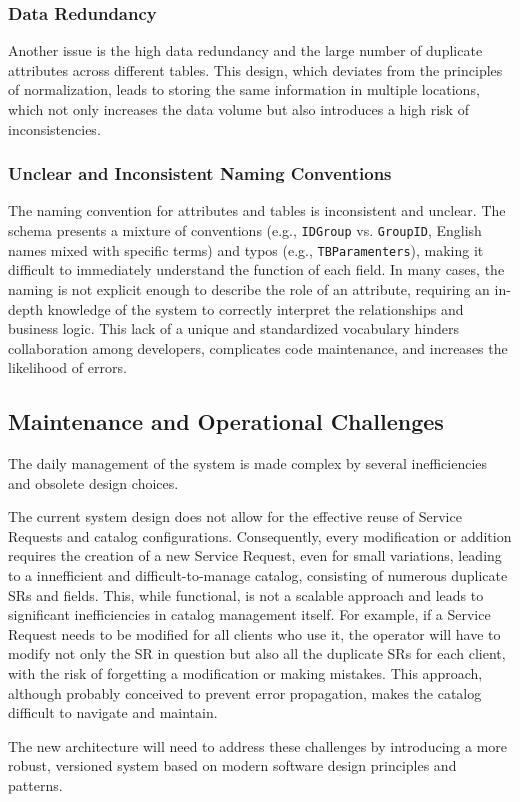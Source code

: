 \subsubsection{Data Redundancy}
Another issue is the high data redundancy and the large number of duplicate attributes across different tables. This design, which deviates from the principles of normalization, leads to storing the same information in multiple locations, which not only increases the data volume but also introduces a high risk of inconsistencies.

\subsubsection{Unclear and Inconsistent Naming Conventions}
The naming convention for attributes and tables is inconsistent and unclear. The schema presents a mixture of conventions (e.g., \texttt{IDGroup} vs. \texttt{GroupID}, English names mixed with specific terms) and typos (e.g., \texttt{TBParamenters}), making it difficult to immediately understand the function of each field. In many cases, the naming is not explicit enough to describe the role of an attribute, requiring an in-depth knowledge of the system to correctly interpret the relationships and business logic. This lack of a unique and standardized vocabulary hinders collaboration among developers, complicates code maintenance, and increases the likelihood of errors.

\subsection{Maintenance and Operational Challenges}

The daily management of the system is made complex by several inefficiencies and obsolete design choices.

The current system design does not allow for the effective reuse of Service Requests and catalog configurations. Consequently, every modification or addition requires the creation of a new Service Request, even for small variations, leading to a innefficient and difficult-to-manage catalog, consisting of numerous duplicate SRs and fields. This, while functional, is not a scalable approach and leads to significant inefficiencies in catalog management itself. For example, if a Service Request needs to be modified for all clients who use it, the operator will have to modify not only the SR in question but also all the duplicate SRs for each client, with the risk of forgetting a modification or making mistakes. This approach, although probably conceived to prevent error propagation, makes the catalog difficult to navigate and maintain.

The new architecture will need to address these challenges by introducing a more robust, versioned system based on modern software design principles and patterns.